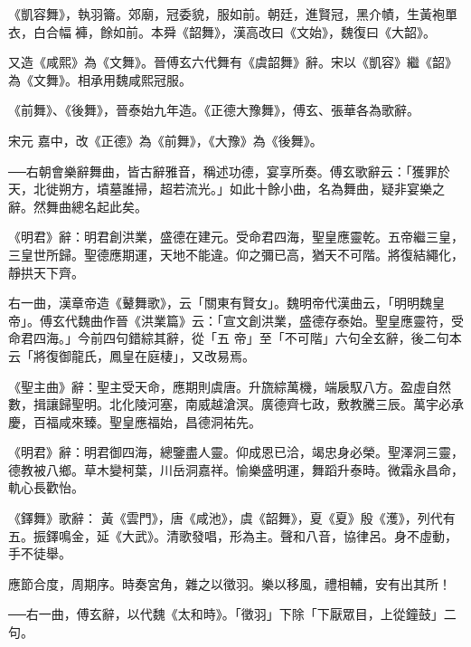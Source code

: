\begin{pinyinscope}
 《凱容舞》，執羽籥。郊廟，冠委貌，服如前。朝廷，進賢冠，黑介幘，生黃袍單衣，白合幅褲，餘如前。本舜《韶舞》，漢高改曰《文始》，魏復曰《大韶》。



 又造《咸熙》為《文舞》。晉傅玄六代舞有《虞韶舞》辭。宋以《凱容》繼《韶》為《文舞》。相承用魏咸熙冠服。



 《前舞》、《後舞》，晉泰始九年造。《正德大豫舞》，傅玄、張華各為歌辭。



 宋元
 嘉中，改《正德》為《前舞》，《大豫》為《後舞》。



 ──右朝會樂辭舞曲，皆古辭雅音，稱述功德，宴享所奏。傅玄歌辭云：「獲罪於天，北徙朔方，墳墓誰掃，超若流光。」如此十餘小曲，名為舞曲，疑非宴樂之辭。然舞曲總名起此矣。



 《明君》辭：明君創洪業，盛德在建元。受命君四海，聖皇應靈乾。五帝繼三皇，三皇世所歸。聖德應期運，天地不能違。仰之彌已高，猶天不可階。將復結繩化，靜拱天下齊。



 右一曲，漢章帝造《鼙舞歌》，云「關東有賢女」。魏明帝代漢曲云，「明明魏皇帝」。傅玄代魏曲作晉《洪業篇》云：「宣文創洪業，盛德存泰始。聖皇應靈符，受命君四海。」今前四句錯綜其辭，從「五
 帝」至「不可階」六句全玄辭，後二句本云「將復御龍氏，鳳皇在庭棲」，又改易焉。



 《聖主曲》辭：聖主受天命，應期則虞唐。升旒綜萬機，端扆馭八方。盈虛自然數，揖讓歸聖明。北化陵河塞，南威越滄溟。廣德齊七政，敷教騰三辰。萬宇必承慶，百福咸來臻。聖皇應福始，昌德洞祐先。



 《明君》辭：明君御四海，總鑒盡人靈。仰成恩已洽，竭忠身必榮。聖澤洞三靈，德教被八鄉。草木變柯葉，川岳洞嘉祥。愉樂盛明運，舞蹈升泰時。微霜永昌命，軌心長歡怡。



 《鐸舞》歌辭：
 黃《雲門》，唐《咸池》，虞《韶舞》，夏《夏》殷《濩》，列代有五。振鐸鳴金，延《大武》。清歌發唱，形為主。聲和八音，協律呂。身不虛動，手不徒舉。



 應節合度，周期序。時奏宮角，雜之以徵羽。樂以移風，禮相輔，安有出其所！



 ──右一曲，傅玄辭，以代魏《太和時》。「徵羽」下除「下厭眾目，上從鐘鼓」二句。




\end{pinyinscope}
